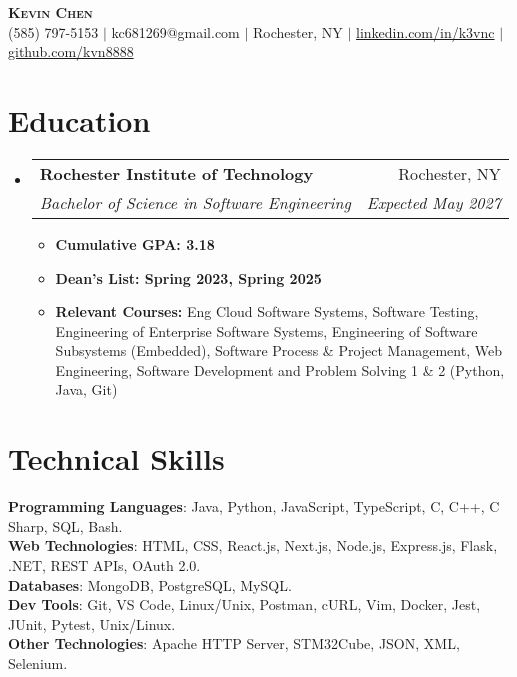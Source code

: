 \documentclass[letterpaper,11pt]{article}
\makeatletter
\newcommand{\resumeItem}[1]{
  \item\small{
    {#1 \vspace{-2pt}}
  }
}
\newcommand{\resumeSubheading}[4]{
  \vspace{-2pt}\item
    \begin{tabular*}{0.97\textwidth}[t]{l@{\extracolsep{\fill}}r}
      \textbf{#1} & #2 \\
      \textit{\small#3} & \textit{\small #4} \\
    \end{tabular*}\vspace{-7pt}
}
\newcommand{\resumeSubHeadingListStart}{\begin{itemize}[leftmargin=0.15in, label={}]}
\newcommand{\resumeSubHeadingListEnd}{\end{itemize}}
\newcommand{\resumeItemListStart}{\begin{itemize}}
\newcommand{\resumeItemListEnd}{\end{itemize}\vspace{-5pt}}
\makeatother
\begin{document}

\begin{center}
    \textbf{\Huge \scshape Kevin Chen} \\ \vspace{1pt}
    \small (585) 797-5153 $|$ kc681269@gmail.com $|$ Rochester, NY $|$ 
    \href{https://www.linkedin.com/in/k3vnc/}{linkedin.com/in/k3vnc} $|$ 
    \href{https://github.com/kvn8888}{github.com/kvn8888}
\end{center}


\section{Education}
  \resumeSubHeadingListStart
    \resumeSubheading
      {Rochester Institute of Technology}{Rochester, NY}
      {Bachelor of Science in Software Engineering}{Expected May 2027}
      \resumeItemListStart
        \resumeItem{\textbf{Cumulative GPA: 3.18}}
        \resumeItem{\textbf{Dean's List: Spring 2023, Spring 2025}}
        \resumeItem{\textbf{Relevant Courses:} Eng Cloud Software Systems, Software Testing, Engineering of Enterprise Software Systems, Engineering of Software Subsystems (Embedded), Software Process \& Project Management, Web Engineering, Software Development and Problem Solving 1 \& 2 (Python, Java, Git)}
      \resumeItemListEnd
  \resumeSubHeadingListEnd

\section{Technical Skills}
\begin{itemize}[leftmargin=0.15in, label={}]
\small{\item{
\textbf{Programming Languages}{: Java, Python, JavaScript, TypeScript, C, C++, C Sharp, SQL, Bash.} \\
\textbf{Web Technologies}{: HTML, CSS, React.js, Next.js, Node.js, Express.js, Flask, .NET, REST APIs, OAuth 2.0.} \\
\textbf{Databases}{: MongoDB, PostgreSQL, MySQL.} \\
\textbf{Dev Tools}{: Git, VS Code, Linux/Unix, Postman, cURL, Vim, Docker, Jest, JUnit, Pytest, Unix/Linux.} \\
\textbf{Other Technologies}{: Apache HTTP Server, STM32Cube, JSON, XML, Selenium.}}}\\
\end{itemize}
\end{document}
